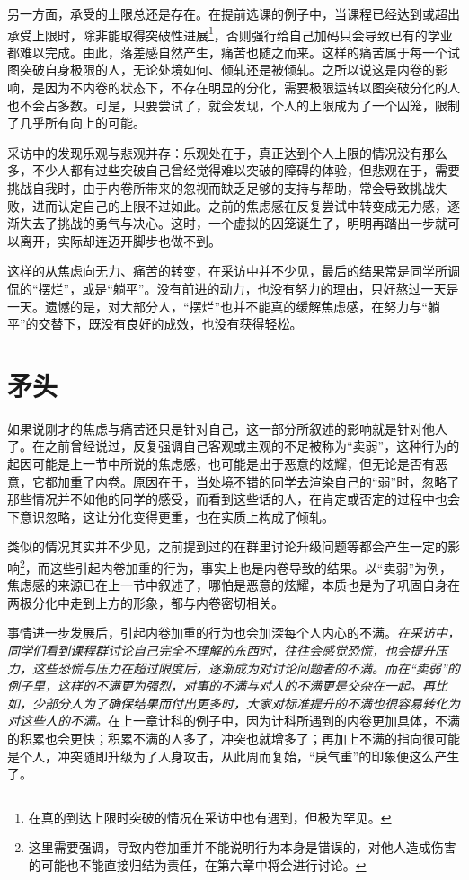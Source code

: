 \documentclass[UTF8,a4paper,fontset=windows,11pt,openany]{ctexbook}
\begin{document}
另一方面，承受的上限总还是存在。在提前选课的例子中，当课程已经达到或超出承受上限时，除非能取得突破性进展\footnote{在真的到达上限时突破的情况在采访中也有遇到，但极为罕见。}，否则强行给自己加码只会导致已有的学业都难以完成。由此，落差感自然产生，痛苦也随之而来。这样的痛苦属于每一个试图突破自身极限的人，无论处境如何、倾轧还是被倾轧。之所以说这是内卷的影响，是因为不内卷的状态下，不存在明显的分化，需要极限运转以图突破分化的人也不会占多数。可是，只要尝试了，就会发现，个人的上限成为了一个囚笼，限制了几乎所有向上的可能。

采访中的发现乐观与悲观并存：乐观处在于，真正达到个人上限的情况没有那么多，不少人都有过些突破自己曾经觉得难以突破的障碍的体验，但悲观在于，需要挑战自我时，由于内卷所带来的忽视而缺乏足够的支持与帮助，常会导致挑战失败，进而认定自己的上限不过如此。之前的焦虑感在反复尝试中转变成无力感，逐渐失去了挑战的勇气与决心。这时，一个虚拟的囚笼诞生了，明明再踏出一步就可以离开，实际却连迈开脚步也做不到。

这样的从焦虑向无力、痛苦的转变，在采访中并不少见，最后的结果常是同学所调侃的“摆烂”，或是“躺平”。没有前进的动力，也没有努力的理由，只好熬过一天是一天。遗憾的是，对大部分人，“摆烂”也并不能真的缓解焦虑感，在努力与“躺平”的交替下，既没有良好的成效，也没有获得轻松。

\section{矛头}

如果说刚才的焦虑与痛苦还只是针对自己，这一部分所叙述的影响就是针对他人了。在之前曾经说过，反复强调自己客观或主观的不足被称为“卖弱”，这种行为的起因可能是上一节中所说的焦虑感，也可能是出于恶意的炫耀，但无论是否有恶意，它都加重了内卷。原因在于，当处境不错的同学去渲染自己的“弱”时，忽略了那些情况并不如他的同学的感受，而看到这些话的人，在肯定或否定的过程中也会下意识忽略，这让分化变得更重，也在实质上构成了倾轧。

类似的情况其实并不少见，之前提到过的在群里讨论升级问题等都会产生一定的影响\footnote{这里需要强调，导致内卷加重并不能说明行为本身是错误的，对他人造成伤害的可能也不能直接归结为责任，在第六章中将会进行讨论。}，而这些引起内卷加重的行为，事实上也是内卷导致的结果。以“卖弱”为例，焦虑感的来源已在上一节中叙述了，哪怕是恶意的炫耀，本质也是为了巩固自身在两极分化中走到上方的形象，都与内卷密切相关。

事情进一步发展后，引起内卷加重的行为也会加深每个人内心的不满。\emph{在采访中，同学们看到课程群讨论自己完全不理解的东西时，往往会感觉恐慌，也会提升压力，这些恐慌与压力在超过限度后，逐渐成为对讨论问题者的不满。而在“卖弱”的例子里，这样的不满更为强烈，对事的不满与对人的不满更是交杂在一起。再比如，少部分人为了确保结果而付出更多时，大家对标准提升的不满也很容易转化为对这些人的不满。}在上一章计科的例子中，因为计科所遇到的内卷更加具体，不满的积累也会更快；积累不满的人多了，冲突也就增多了；再加上不满的指向很可能是个人，冲突随即升级为了人身攻击，从此周而复始，“戾气重”的印象便这么产生了。
\end{document}
